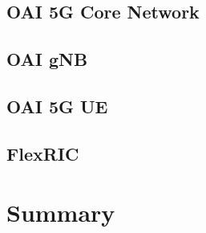 \subsection{OAI 5G Core Network}
\subsection{OAI gNB}
\subsection{OAI 5G UE}
\subsection{FlexRIC}


\section{Summary}






